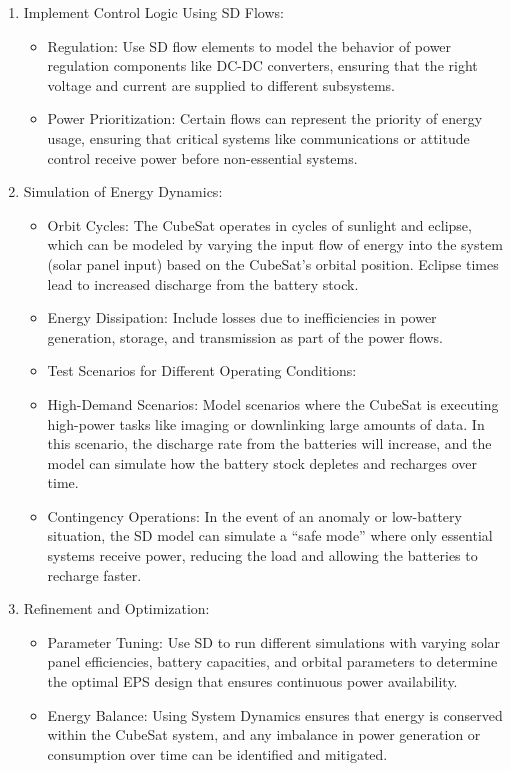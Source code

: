 \documentclass[11pt, a4paper]{article}
\begin{document}
\begin{enumerate}
\item  Implement Control Logic Using SD Flows:
\begin{itemize}
\item  Regulation: Use SD flow elements to model the behavior of power regulation components like DC-DC converters, ensuring that the right voltage and current are supplied to different subsystems.
\item  Power Prioritization: Certain flows can represent the priority of energy usage, ensuring that critical systems like communications or attitude control receive power before non-essential systems.
\end{itemize}
\item  Simulation of Energy Dynamics:
\begin{itemize}
\item  Orbit Cycles: The CubeSat operates in cycles of sunlight and eclipse, which can be modeled by varying the input flow of energy into the system (solar panel input) based on the CubeSat's orbital position. Eclipse times lead to increased discharge from the battery stock.
\item  Energy Dissipation: Include losses due to inefficiencies in power generation, storage, and transmission as part of the power flows.
\item  Test Scenarios for Different Operating Conditions:
\end{itemize}
\begin{itemize}
\item  High-Demand Scenarios: Model scenarios where the CubeSat is executing high-power tasks like imaging or downlinking large amounts of data. In this scenario, the discharge rate from the batteries will increase, and the model can simulate how the battery stock depletes and recharges over time.
\item  Contingency Operations: In the event of an anomaly or low-battery situation, the SD model can simulate a ``safe mode'' where only essential systems receive power, reducing the load and allowing the batteries to recharge faster.
\end{itemize}
\item  Refinement and Optimization:
\begin{itemize}
\item  Parameter Tuning: Use SD to run different simulations with varying solar panel efficiencies, battery capacities, and orbital parameters to determine the optimal EPS design that ensures continuous power availability.
\item  Energy Balance: Using System Dynamics ensures that energy is conserved within the CubeSat system, and any imbalance in power generation or consumption over time can be identified and mitigated.
\end{itemize}
\end{enumerate}
\end{document}
